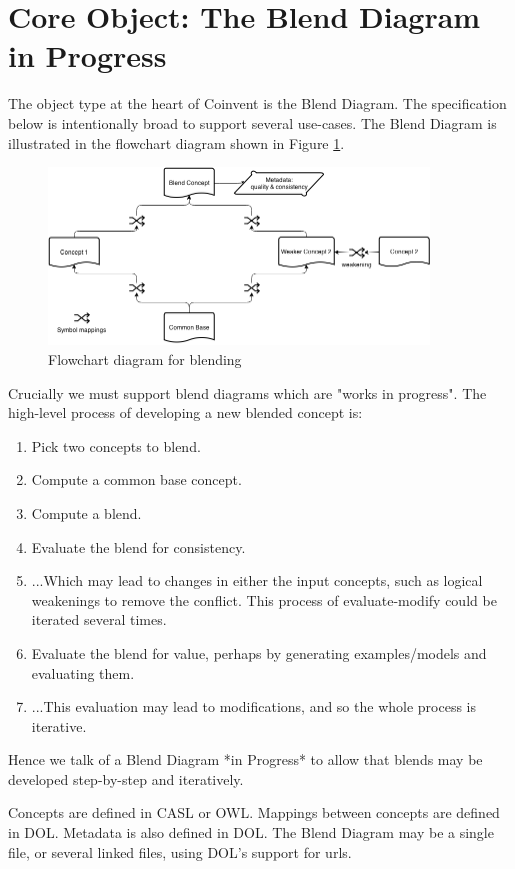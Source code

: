 \documentclass[a4paper,twoside,11pt]{article}
\begin{document}
\section{Core Object: The Blend Diagram in Progress}\label{sec:bdip}

The object type at the heart of Coinvent is the Blend Diagram. The specification below is intentionally broad to support several use-cases. The Blend Diagram is illustrated in the flowchart diagram shown in Figure \ref{fig:flowchart}.

\begin{figure}[!ht]
\includegraphics[width=0.9\textwidth]{BlendDiagram.png}
\caption{Flowchart diagram for blending}
\label{fig:flowchart}
\end{figure}


Crucially we must support blend diagrams which are "works in progress". The high-level process of developing a new blended concept is:
\begin{enumerate}
\item Pick two concepts to blend.
\item Compute a common base concept.
\item Compute a blend.
\item Evaluate the blend for consistency.
\item ...Which may lead to changes in either the input concepts, such as logical weakenings to remove the conflict. This process of evaluate-modify could be iterated several times.
\item Evaluate the blend for value, perhaps by generating examples/models and evaluating them.
\item ...This evaluation may lead to modifications, and so the whole process is iterative.
\end{enumerate}
Hence we talk of a Blend Diagram *in Progress* to allow that blends may be developed step-by-step and iteratively.

Concepts are defined in CASL or OWL. Mappings between concepts are defined in DOL. Metadata is also defined in DOL. The Blend Diagram may be a single file, or several linked files, using DOL's support for urls.
\end{document}
